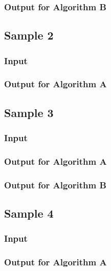 \subsubsection*{Output for Algorithm B}\label{app:sample1-output-b}



\clearpage
\subsection*{Sample 2}\label{app:sample-2}
\subsubsection*{Input}

\vspace{1cm}
\subsubsection*{Output for Algorithm A}\label{app:sample2-output-a}



\clearpage
\subsection*{Sample 3}\label{app:sample-3}
\subsubsection*{Input}

\vspace{1cm}
\subsubsection*{Output for Algorithm A}

\clearpage
\subsubsection*{Output for Algorithm B}



\clearpage
\subsection*{Sample 4}\label{app:sample-4}
\subsubsection*{Input}

\vspace{1cm}
\subsubsection*{Output for Algorithm A}

